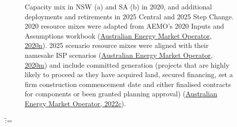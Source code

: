 \documentclass[12pt,a4paper,]{report}
\makeatletter
\newcounter{pandoccrossref@subfigures@footnote@counter}
\newenvironment{pandoccrossrefsubfigures}{%
\setcounter{pandoccrossref@subfigures@footnote@counter}{0}
\begin{figure}\centering%
\gdef\global@pandoccrossref@subfigures@footnotes{}%
\DeclareRobustCommand{\footnote}[1]{\footnotemark%
\stepcounter{pandoccrossref@subfigures@footnote@counter}%
\ifx\global@pandoccrossref@subfigures@footnotes\empty%
\gdef\global@pandoccrossref@subfigures@footnotes{{##1}}%
\else%
\g@addto@macro\global@pandoccrossref@subfigures@footnotes{, {##1}}%
\fi}}%
{\end{figure}%
\addtocounter{footnote}{-\value{pandoccrossref@subfigures@footnote@counter}}
\@for\f:=\global@pandoccrossref@subfigures@footnotes\do{\stepcounter{footnote}\footnotetext{\f}}%
\gdef\global@pandoccrossref@subfigures@footnotes{}}
\makeatother
\begin{document}
\begin{pandoccrossrefsubfigures}



\caption[Capacity mix in NSW and SA in 2020 and the two 2025 scenarios]{Capacity mix in NSW (a) and SA (b) in
2020, and additional deployments and retirements in 2025 Central and
2025 Step Change. 2020 resource mixes were adapted from AEMO's 2020
Inputs and Assumptions workbook
(\protect\hyperlink{ref-australianenergymarketoperator2020InputsAssumptions2020}{Australian
Energy Market Operator, 2020n}). 2025 scenario resource mixes were
aligned with their namesake ISP scenarios
(\protect\hyperlink{ref-australianenergymarketoperator2020ISPGeneration2020}{Australian
Energy Market Operator, 2020m}) and include committed generation
(projects that are highly likely to proceed as they have acquired land,
secured financing, set a firm construction commencement date and either
finalised contracts for components or been granted planning approval)
(\protect\hyperlink{ref-australianenergymarketoperatorGenerationInformation2022}{Australian
Energy Market Operator, 2022c}).}

\label{fig:capacities}

\end{pandoccrossrefsubfigures}
\end{document}

